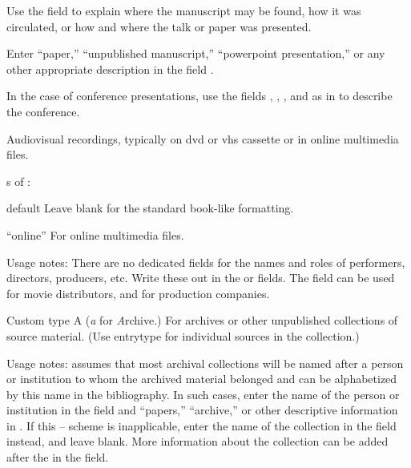 \documentclass{ltxdockit}[2010/02/12]
\begin{document}
\begin{typelist}
Use the  field to explain where the manuscript may be found, how it was circulated, or how and where the talk or paper was presented. 
 
Enter ``paper,'' ``unpublished manuscript,'' ``powerpoint presentation,'' or any other appropriate description in the field . 

In the case of conference presentations, use the fields , , , and  as in  to describe the conference.





Audiovisual recordings, typically on dvd or vhs cassette or in online multimedia files.

s of :
\begin{valuelist}
\item[default] Leave  blank for the standard book-like formatting.
\item[``online''] For online multimedia files.
\end{valuelist}


Usage notes: There are no dedicated fields for the names and roles of performers, directors, producers, etc. Write these out in the  or  fields.
The  field can be used for movie distributors, and  for production companies.



Custom type A (\emph{a} for \emph{A}rchive.)
For archives or other unpublished collections of source material. (Use entrytype  for individual sources in the collection.)



Usage notes:  assumes that most archival collections will be named after a person or institution to whom the archived material belonged and can be alphabetized by this name in the bibliography. In such cases, enter the name of the person or institution in the  field and ``papers,'' ``archive,'' or other descriptive information in . If this -- scheme is inapplicable, enter the name of the collection in the  field instead, and leave  blank. More information about the collection can be added after the  in the  field.  


\end{typelist}
\end{document}
